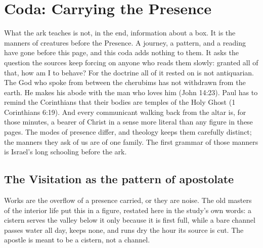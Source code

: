 \sectionguard
\section{Coda: Carrying the Presence}

What the ark teaches is not, in the end, information about a box. It is
the manners of creatures before the Presence. A journey, a pattern, and
a reading have gone before this page, and this coda adds nothing to
them. It asks the question the sources keep forcing on anyone who reads
them slowly: granted all of that, how am I to behave? For the doctrine
all of it rested on is not antiquarian. The God who spoke from between the cherubims has not
withdrawn from the earth. He makes his abode with the man who loves him
(John 14:23). Paul has to remind the Corinthians that their bodies are
temples of the Holy Ghost (1 Corinthians 6:19). And every communicant
walking back from the altar is, for those minutes, a bearer of Christ
in a sense more literal than any figure in these pages. The modes of
presence differ, and theology keeps them carefully distinct; the
manners they ask of us are of one family. The first grammar of those
manners is Israel's long schooling before the ark.

\subsection{The Visitation as the pattern of apostolate}

Works are the overflow of a presence carried, or they are noise. The
old masters of the interior life put this in a figure, restated here in
the study's own words: a cistern serves the valley below it only
because it is first full, while a bare channel passes water all day,
keeps none, and runs dry the hour its source is cut. The apostle is
meant to be a cistern, not a channel.

